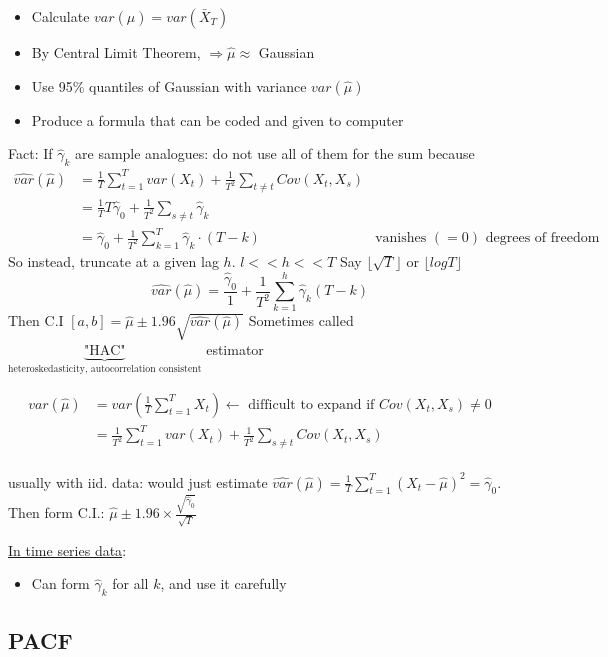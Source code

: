 \begin{itemize}
    \item Calculate $var(\hat{\mu})=var(\bar{X}_T) $
    \item By Central Limit Theorem, $\Rightarrow \hat{\mu} \approx$ Gaussian
    \item Use 95\% quantiles of Gaussian with variance $var(\hat{\mu})$
    \item Produce a formula that can be coded and given to computer
\end{itemize}
Fact: If $\hat{\gamma}_k$ are sample analogues: do not use all of them for the sum because \begin{align*}
    \hat{var}(\hat{\mu}) &= \frac{1}{T}\sum_{t=1}^T var(X_t) + \frac{1}{T^2} \sum_{t\neq t} Cov(X_t, X_s) \\
    &= \frac{1}{T} T \hat{\gamma}_0 + \frac{1}{T^2} \sum_{s\neq t} \hat{\gamma}_k\\
    &= \hat{\gamma}_0 + \frac{1}{T^2} \sum_{k=1}^T \hat{\gamma}_k \cdot (T-k)
    &\text{vanishes $(=0)$ degrees of freedom problem}
\end{align*}
So instead, truncate at a given lag $h$. $l<<h<<T$ \quad Say \( \lfloor \sqrt{T} \rfloor \) or \( \lfloor log T \rfloor \)
\[
\hat{var}(\hat{\mu})=\frac{\hat{\gamma}_0}{1} + \frac{1}{T^2}\sum_{k=1}^h \hat{\gamma}_k (T-k)
\]
Then C.I $[a,b]=\hat{\mu} \pm 1.96 \sqrt{\hat{var}(\hat{\mu})} $
Sometimes called $\underbrace{\text{"HAC"}}_\text{heteroskedasticity, autocorrelation consistent}$ estimator

\begin{align*}
    var(\hat{\mu})&=var(\frac{1}{T}\sum_{t=1}^T X_t) \leftarrow \text{ difficult to expand if $Cov(X_t, X_s)\neq 0$}\\
    &=\frac{1}{T^2} \sum_{t=1}^T var(X_t) + \frac{1}{T^2} \sum_{s\neq t} Cov(X_t,X_s)\\
\end{align*}

usually with iid. data: would just estimate $\hat{var}(\hat{\mu})=\frac{1}{T}\sum_{t=1}^T(X_t-\hat{\mu})^2=\hat{\gamma}_0 $. Then form C.I.: $\hat{\mu}\pm 1.96 \times \frac{\sqrt{\hat{\gamma}_0}}{\sqrt{T}} $

\underline{In time series data}:
\begin{itemize}
    \item Can form $\hat{\gamma}_k$ for all $k$, and use it carefully
\end{itemize}


\subsection{PACF}

